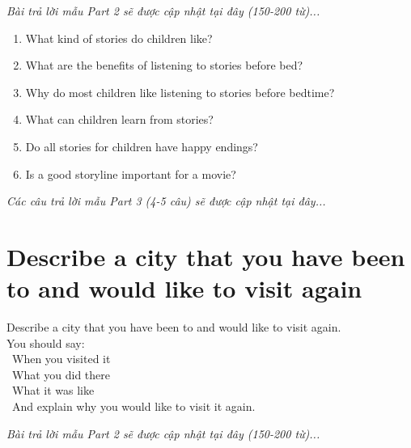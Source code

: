 \vspace{1em}
\textit{Bài trả lời mẫu Part 2 sẽ được cập nhật tại đây (150-200 từ)...}
\vspace{2em}

\begin{ieltsprompt}
\begin{enumerate}[itemsep=4pt]
    \item What kind of stories do children like?
    \item What are the benefits of listening to stories before bed?
    \item Why do most children like listening to stories before bedtime?
    \item What can children learn from stories?
    \item Do all stories for children have happy endings?
    \item Is a good storyline important for a movie?
\end{enumerate}
\end{ieltsprompt}

\vspace{1em}
\textit{Các câu trả lời mẫu Part 3 (4-5 câu) sẽ được cập nhật tại đây...}
\vspace{2em}

\section{Describe a city that you have been to and would like to visit again}
\begin{ieltsprompt}
Describe a city that you have been to and would like to visit again. \\
You should say: \\
\textbullet\ When you visited it \\
\textbullet\ What you did there \\
\textbullet\ What it was like \\
\textbullet\ And explain why you would like to visit it again. \\
\end{ieltsprompt}

\vspace{1em}
\textit{Bài trả lời mẫu Part 2 sẽ được cập nhật tại đây (150-200 từ)...}
\vspace{2em}

